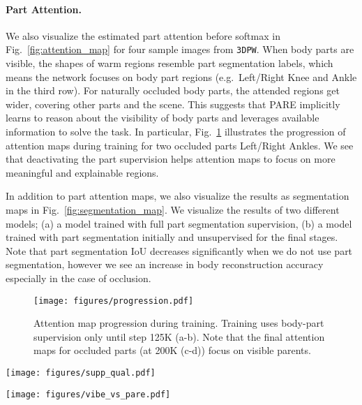 \documentclass[10pt,twocolumn,letterpaper,usenames,dvipsnames]{article}
\newcommand{\methodname}{PARE\xspace}
\newcommand{\threedpw}{\texttt{3DPW}\xspace}
\renewcommand{\ie}{i.e.\xspace}
\renewcommand{\eg}{e.g.\xspace}
\begin{document}
\paragraph{Part Attention.}
We also visualize the estimated part attention  before softmax in Fig.~\ref{fig:attention_map} for four sample images from \threedpw \cite{vonMarcard2018_3dpw}. 
When body parts are visible, the shapes of warm regions resemble part segmentation labels, which means the network focuses on body part regions (\eg~Left/Right Knee and Ankle in the third row). For naturally occluded body parts, the attended regions get wider, covering other parts and the scene. 
This suggests that \methodname implicitly learns to reason about the visibility of body parts and leverages available information to solve the task.
In particular, Fig.~\ref{fig:attention_rebuttal} illustrates the progression of attention maps during training for two occluded parts Left/Right Ankles.
We see that deactivating the part supervision helps attention maps to focus on more meaningful and explainable regions.

In addition to part attention maps, we also visualize the results as segmentation maps in Fig.~\ref{fig:segmentation_map}. We visualize the results of two different models; (a) a model trained with full part segmentation supervision, (b) a model trained with part segmentation initially and unsupervised for the final stages. Note that part segmentation IoU decreases significantly when we do not use part segmentation, however we see an increase in body reconstruction accuracy especially in the case of occlusion.
\begin{figure}[t]
	\centering
	\texttt{[image: figures/progression.pdf]}
\caption{Attention map progression during training. Training uses body-part supervision only until step 125K (a-b). Note that the final attention maps  for occluded parts (at 200K (c-d)) focus on visible parents.} \label{fig:attention_rebuttal}
\end{figure}{}

\newpage
\begin{figure*}
	\centering
	\texttt{[image: figures/supp\_qual.pdf]}
	\caption{\textbf{Qualitative comparison.} Here, we compare \methodname with recent state-of-the-art methods \ie SPIN~\cite{SPIN:ICCV:2019}, HMR-EFT~\cite{joo2020eft}, and Zhang \etal~\cite{zhangoohcvpr20}.}
	\label{fig:quali-results}
\end{figure*}{}

\begin{figure*}[t]
	\centering
	\texttt{[image: figures/vibe\_vs\_pare.pdf]}
	\caption{Comparison of VIBE~\cite{kocabas2019vibe} with our method, \methodname. Note that VIBE is a video-based method, while PARE is run on each video frame independently.}
	\label{fig:vibe}
\end{figure*}{}
\end{document}
